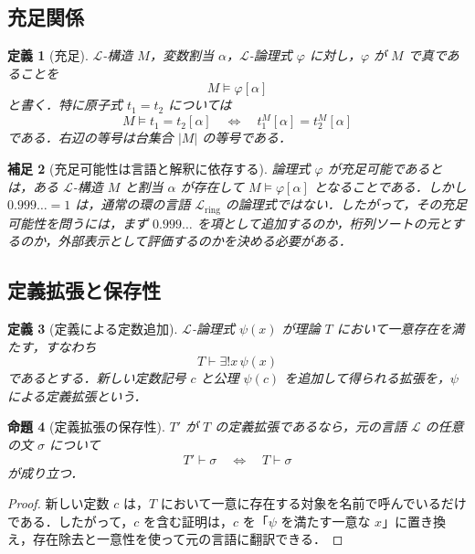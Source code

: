 \documentclass[a4paper,11pt]{ltjsarticle}
\theoremstyle{jpdef}
\newtheorem{definition}{定義}[section]
\newtheorem{remark}[definition]{補足}
\theoremstyle{jpthm}
\newtheorem{proposition}[definition]{命題}
\newcommand{\Lang}{\mathcal L}
\begin{document}
\subsection{充足関係}

\begin{definition}[充足]
\(\Lang\)-構造 \(M\)，変数割当 \(\alpha\)，\(\Lang\)-論理式 \(\varphi\) に対し，\(\varphi\) が \(M\) で真であることを
\[
  M\models \varphi[\alpha]
\]
と書く．特に原子式 \(t_1=t_2\) については
\[
  M\models t_1=t_2[\alpha]
  \quad\Longleftrightarrow\quad
  t_1^M[\alpha]=t_2^M[\alpha]
\]
である．右辺の等号は台集合 \(|M|\) の等号である．
\end{definition}

\begin{remark}[充足可能性は言語と解釈に依存する]
論理式 \(\varphi\) が充足可能であるとは，ある \(\Lang\)-構造 \(M\) と割当 \(\alpha\) が存在して \(M\models\varphi[\alpha]\) となることである．しかし \(0.999\ldots=1\) は，通常の環の言語 \(\Lang_{\mathrm{ring}}\) の論理式ではない．したがって，その充足可能性を問うには，まず \(0.999\ldots\) を項として追加するのか，桁列ソートの元とするのか，外部表示として評価するのかを決める必要がある．
\end{remark}

\subsection{定義拡張と保存性}

\begin{definition}[定義による定数追加]
\(\Lang\)-論理式 \(\psi(x)\) が理論 \(T\) において一意存在を満たす，すなわち
\[
  T\vdash \exists!x\,\psi(x)
\]
であるとする．新しい定数記号 \(c\) と公理 \(\psi(c)\) を追加して得られる拡張を，\(\psi\) による定義拡張という．
\end{definition}

\begin{proposition}[定義拡張の保存性]
\(T'\) が \(T\) の定義拡張であるなら，元の言語 \(\Lang\) の任意の文 \(\sigma\) について
\[
  T'\vdash \sigma
  \quad\Longleftrightarrow\quad
  T\vdash \sigma
\]
が成り立つ．
\end{proposition}

\begin{proof}
新しい定数 \(c\) は，\(T\) において一意に存在する対象を名前で呼んでいるだけである．したがって，\(c\) を含む証明は，\(c\) を「\(\psi\) を満たす一意な \(x\)」に置き換え，存在除去と一意性を使って元の言語に翻訳できる．
\end{proof}
\end{document}
